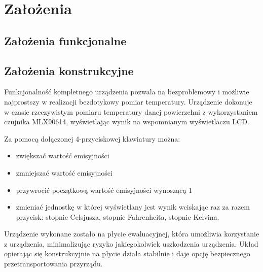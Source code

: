 \chapter{Założenia}

    \section{Założenia funkcjonalne}
    \section{Założenia konstrukcyjne}


    Funkcjonalność kompletnego urządzenia pozwala na bezproblemowy i możliwie najprostszy w realizacji bezdotykowy pomiar temperatury. Urządzenie dokonuje w czasie rzeczywistym pomiaru temperatury danej powierzchni z wykorzystaniem czujnika MLX90614, wyświetlając wynik na wspomnianym wyświetlaczu LCD. 
    
    \vspace{12pt}

    Za pomocą dołączonej 4-przyciskowej klawiatury można:

    \begin{itemize}

        \item zwiększać wartość emisyjności
        \item zmniejszać wartość emisyjności
        \item przywrocić początkową wartość emisyjności wynoszącą 1
        \item zmieniać jednostkę w której wyświetlany jest wynik wciskając raz za razem przycisk: stopnie Celsjusza, stopnie Fahrenheita, stopnie Kelvina.

    \end{itemize}

    
    Urządzenie wykonane zostało na płycie ewaluacyjnej, która umożliwia korzystanie z urządzenia, minimalizując ryzyko jakiegokolwiek uszkodzenia urządzenia. Układ opierając się konstrukcyjnie na płycie działa stabilnie i daje opcję bezpiecznego przetransportowania przyrządu.

